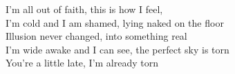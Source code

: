 I'm all out of faith, this is how I feel,\\
I'm cold and I am shamed, lying naked on the floor \\
Illusion never changed, into something real \\
I'm wide awake and I can see, the perfect sky is torn \\
You're a little late, I'm already torn \\

